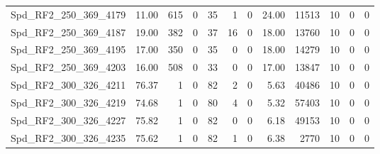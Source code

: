 \begin{longtable}[c]{@{}lrrrrrrrrrrr@{}}
Spd\_RF2\_250\_369\_4179     & 11.00                  & 615                     & 0                       & 35                     & 1                       & 0                       & 24.00                   & 11513                    & 10                       & 0                        & 0                        \\
Spd\_RF2\_250\_369\_4187     & 19.00                  & 382                     & 0                       & 37                     & 16                      & 0                       & 18.00                   & 13760                    & 10                       & 0                        & 0                        \\
Spd\_RF2\_250\_369\_4195     & 17.00                  & 350                     & 0                       & 35                     & 0                       & 0                       & 18.00                   & 14279                    & 10                       & 0                        & 0                        \\
Spd\_RF2\_250\_369\_4203     & 16.00                  & 508                     & 0                       & 33                     & 0                       & 0                       & 17.00                   & 13847                    & 10                       & 0                        & 0                        \\
Spd\_RF2\_300\_326\_4211     & 76.37                  & 1                       & 0                       & 82                     & 2                       & 0                       & 5.63                    & 40486                    & 10                       & 0                        & 0                        \\
Spd\_RF2\_300\_326\_4219     & 74.68                  & 1                       & 0                       & 80                     & 4                       & 0                       & 5.32                    & 57403                    & 10                       & 0                        & 0                        \\
Spd\_RF2\_300\_326\_4227     & 75.82                  & 1                       & 0                       & 82                     & 0                       & 0                       & 6.18                    & 49153                    & 10                       & 0                        & 0                        \\
Spd\_RF2\_300\_326\_4235     & 75.62                  & 1                       & 0                       & 82                     & 1                       & 0                       & 6.38                    & 2770                     & 10                       & 0                        & 0                        \\

\end{longtable}
